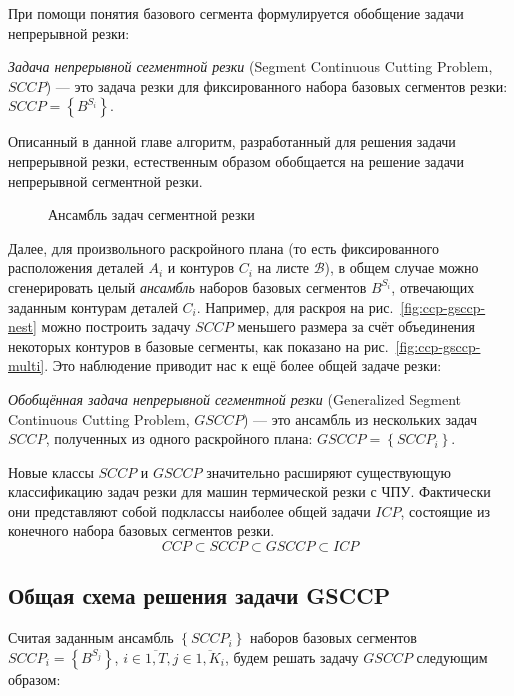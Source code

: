 При помощи понятия базового сегмента
формулируется обобщение задачи непрерывной резки:

\textit{Задача непрерывной сегментной резки}
(Segment Continuous Cutting Problem, $SCCP$)
--- это задача резки
для фиксированного набора базовых сегментов резки:
$SCCP = \left\{B^{S_i}\right\}$.

Описанный в данной главе алгоритм,
разработанный для решения задачи непрерывной резки,
естественным образом обобщается на решение
задачи непрерывной сегментной резки.

\begin{figure}
  \centering
  \caption{Ансамбль задач сегментной резки}
  \label{fig:ccp-gsccp}
\end{figure}

Далее, для произвольного раскройного плана
(то есть фиксированного расположения деталей $A_i$
и контуров $C_i$ на листе $\mathcal B$),
в общем случае можно сгенерировать целый
\textit{ансамбль}
наборов базовых сегментов $B^{S_i}$,
отвечающих заданным контурам деталей $C_i$.
Например,
для раскроя
на рис.~\ref{fig:ccp-gsccp-nest}
можно построить задачу $SCCP$
меньшего размера за счёт
объединения некоторых контуров в базовые сегменты,
как показано на рис.~\ref{fig:ccp-gsccp-multi}.
Это наблюдение приводит нас к ещё более общей задаче резки:

\textit{Обобщённая задача непрерывной сегментной резки}
(Generalized Segment Continuous Cutting Problem, $GSCCP$)
--- это ансамбль из нескольких задач
$SCCP$,
полученных из одного раскройного плана:
$GSCCP = \left\{ SCCP_i \right\}$.

Новые классы
$SCCP$ и $GSCCP$
значительно расширяют существующую классификацию
задач резки для машин термической резки с ЧПУ.
Фактически они представляют собой подклассы
наиболее общей задачи $ICP$,
состоящие из конечного набора базовых сегментов резки.
$$
CCP \subset SCCP \subset GSCCP \subset ICP
$$

\subsection{Общая схема решения задачи GSCCP}

Считая заданным ансамбль
$\left\{ SCCP_i \right\}$
наборов базовых сегментов
$SCCP_i = \left\{B^{S_j}\right\}$,
$
i \in \overline{1, T},
j \in \overline{1, K_i}
$,
будем решать задачу $GSCCP$
следующим образом:


